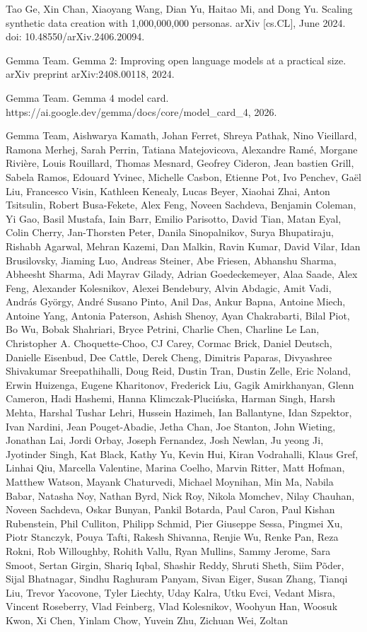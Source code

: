 \documentclass[
  10
]{article}
\begin{document}
Tao Ge, Xin Chan, Xiaoyang Wang, Dian Yu, Haitao Mi, and Dong Yu.
Scaling synthetic data creation with 1,000,000,000 personas. arXiv
{[}cs.CL{]}, June 2024. doi: 10.48550/arXiv.2406.20094.

Gemma Team. Gemma 2: Improving open language models at a practical size.
arXiv preprint arXiv:2408.00118, 2024.

Gemma Team. Gemma 4 model card.
https://ai.google.dev/gemma/docs/core/model\_card\_4, 2026.

Gemma Team, Aishwarya Kamath, Johan Ferret, Shreya Pathak, Nino
Vieillard, Ramona Merhej, Sarah Perrin, Tatiana Matejovicova, Alexandre
Ramé, Morgane Rivière, Louis Rouillard, Thomas Mesnard, Geofrey Cideron,
Jean bastien Grill, Sabela Ramos, Edouard Yvinec, Michelle Casbon,
Etienne Pot, Ivo Penchev, Gaël Liu, Francesco Visin, Kathleen Kenealy,
Lucas Beyer, Xiaohai Zhai, Anton Tsitsulin, Robert Busa-Fekete, Alex
Feng, Noveen Sachdeva, Benjamin Coleman, Yi Gao, Basil Mustafa, Iain
Barr, Emilio Parisotto, David Tian, Matan Eyal, Colin Cherry,
Jan-Thorsten Peter, Danila Sinopalnikov, Surya Bhupatiraju, Rishabh
Agarwal, Mehran Kazemi, Dan Malkin, Ravin Kumar, David Vilar, Idan
Brusilovsky, Jiaming Luo, Andreas Steiner, Abe Friesen, Abhanshu Sharma,
Abheesht Sharma, Adi Mayrav Gilady, Adrian Goedeckemeyer, Alaa Saade,
Alex Feng, Alexander Kolesnikov, Alexei Bendebury, Alvin Abdagic, Amit
Vadi, András György, André Susano Pinto, Anil Das, Ankur Bapna, Antoine
Miech, Antoine Yang, Antonia Paterson, Ashish Shenoy, Ayan Chakrabarti,
Bilal Piot, Bo Wu, Bobak Shahriari, Bryce Petrini, Charlie Chen,
Charline Le Lan, Christopher A. Choquette-Choo, CJ Carey, Cormac Brick,
Daniel Deutsch, Danielle Eisenbud, Dee Cattle, Derek Cheng, Dimitris
Paparas, Divyashree Shivakumar Sreepathihalli, Doug Reid, Dustin Tran,
Dustin Zelle, Eric Noland, Erwin Huizenga, Eugene Kharitonov, Frederick
Liu, Gagik Amirkhanyan, Glenn Cameron, Hadi Hashemi, Hanna
Klimczak-Plucińska, Harman Singh, Harsh Mehta, Harshal Tushar Lehri,
Hussein Hazimeh, Ian Ballantyne, Idan Szpektor, Ivan Nardini, Jean
Pouget-Abadie, Jetha Chan, Joe Stanton, John Wieting, Jonathan Lai,
Jordi Orbay, Joseph Fernandez, Josh Newlan, Ju yeong Ji, Jyotinder
Singh, Kat Black, Kathy Yu, Kevin Hui, Kiran Vodrahalli, Klaus Gref,
Linhai Qiu, Marcella Valentine, Marina Coelho, Marvin Ritter, Matt
Hofman, Matthew Watson, Mayank Chaturvedi, Michael Moynihan, Min Ma,
Nabila Babar, Natasha Noy, Nathan Byrd, Nick Roy, Nikola Momchev, Nilay
Chauhan, Noveen Sachdeva, Oskar Bunyan, Pankil Botarda, Paul Caron, Paul
Kishan Rubenstein, Phil Culliton, Philipp Schmid, Pier Giuseppe Sessa,
Pingmei Xu, Piotr Stanczyk, Pouya Tafti, Rakesh Shivanna, Renjie Wu,
Renke Pan, Reza Rokni, Rob Willoughby, Rohith Vallu, Ryan Mullins, Sammy
Jerome, Sara Smoot, Sertan Girgin, Shariq Iqbal, Shashir Reddy, Shruti
Sheth, Siim Põder, Sijal Bhatnagar, Sindhu Raghuram Panyam, Sivan Eiger,
Susan Zhang, Tianqi Liu, Trevor Yacovone, Tyler Liechty, Uday Kalra,
Utku Evci, Vedant Misra, Vincent Roseberry, Vlad Feinberg, Vlad
Kolesnikov, Woohyun Han, Woosuk Kwon, Xi Chen, Yinlam Chow, Yuvein Zhu,
Zichuan Wei, Zoltan
\end{document}

